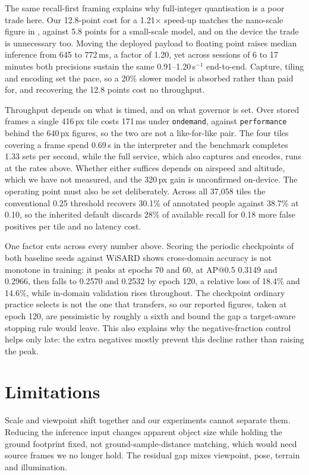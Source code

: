 \documentclass[conference]{IEEEtran}
\begin{document}
The same recall-first framing explains why full-integer quantisation is a poor
trade here. Our 12.8-point cost for a 1.21$\times$ speed-up matches the
nano-scale figure in \cite{rey2025}, against 5.8 points for a small-scale model,
and on the device the trade is unnecessary too. Moving the deployed payload to
floating point raises median inference from 645 to 772\,ms, a factor of 1.20,
yet across sessions of 6 to 17 minutes both precisions sustain the same
0.91--1.20\,s$^{-1}$ end-to-end. Capture, tiling and encoding set the pace, so a
20\% slower model is absorbed rather than paid for, and recovering the 12.8
points cost no throughput.

Throughput depends on what is timed, and on what governor is set. Over stored
frames a single 416\,px tile costs 171\,ms under \texttt{ondemand}, against
\texttt{performance} behind the 640\,px figures, so the two are not a
like-for-like pair. The four tiles covering a frame spend 0.69\,s in the
interpreter and the benchmark completes 1.33 sets per second, while the full
service, which also captures and encodes, runs at the rates above. Whether
either suffices depends on airspeed and altitude, which we have not measured,
and the 320\,px gain is unconfirmed on-device. The operating point must also be
set deliberately. Across all 37,058 tiles the conventional 0.25 threshold
recovers 30.1\% of annotated people against 38.7\% at 0.10, so the inherited
default discards 28\% of available recall for 0.18 more false positives per tile
and no latency cost.

One factor cuts across every number above. Scoring the periodic checkpoints of
both baseline seeds against WiSARD shows cross-domain accuracy is not monotone
in training: it peaks at epochs 70 and 60, at AP@0.5 0.3149 and 0.2966, then
falls to 0.2570 and 0.2532 by epoch 120, a relative loss of 18.4\% and 14.6\%,
while in-domain validation rises throughout. The checkpoint ordinary practice
selects is not the one that transfers, so our reported figures, taken at epoch
120, are pessimistic by roughly a sixth and bound the gap a target-aware
stopping rule would leave. This also explains why the negative-fraction control
helps only late: the extra negatives mostly prevent this decline rather than
raising the peak.

\section{Limitations}
\label{sec:limits}

Scale and viewpoint shift together and our experiments cannot separate them.
Reducing the inference input changes apparent object size while holding the
ground footprint fixed, not ground-sample-distance matching, which would need
source frames we no longer hold. The residual gap mixes viewpoint, pose, terrain
and illumination.
\end{document}
